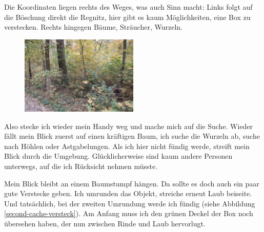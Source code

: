 Die Koordinaten liegen rechts des Weges, was auch Sinn macht: Links folgt auf die Böschung direkt die Regnitz, hier gibt es kaum Möglichkeiten, eine Box zu verstecken. Rechts hingegen Bäume, Sträucher, Wurzeln.

\begin{figure}[H]
    \centering
    \includegraphics[width=0.5\textwidth]{figures/geocaching/second/IMG_3114.jpg}
\end{figure}


Also stecke ich wieder mein Handy weg und mache mich auf die Suche. Wieder fällt mein Blick zuerst auf einen kräftigen Baum, ich suche die Wurzeln ab, suche nach Höhlen oder Astgabelungen. Als ich hier nicht fündig werde, streift mein Blick durch die Umgebung. Glücklicherweise sind kaum andere Personen unterwegs, auf die ich Rücksicht nehmen müsste.

Mein Blick bleibt an einem Baumstumpf hängen. Da sollte es doch auch ein paar gute Verstecke geben. Ich umrunden das Objekt, streiche erneut Laub beiseite. Und tatsächlich, bei der zweiten Umrundung werde ich fündig (siehe Abbildung \ref{second-cache-versteck}). Am Anfang muss ich den grünen Deckel der Box noch übersehen haben, der nun zwischen Rinde und Laub hervorlugt.

